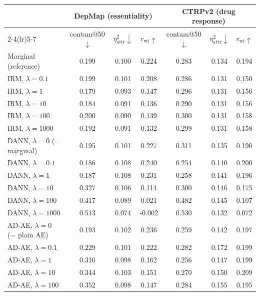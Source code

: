 \begin{table}[t]
  \centering
  \footnotesize
  \begin{tabular}{l ccc ccc}
    \toprule
    & \multicolumn{3}{c}{DepMap (essentiality)} & \multicolumn{3}{c}{CTRPv2 (drug response)} \\
    \cmidrule(lr){2-4}\cmidrule(lr){5-7}
    & contam@50$\downarrow$ & $\eta^2_{\mathrm{attr}}\downarrow$ & $r_{\mathrm{wt}}\uparrow$ & contam@50$\downarrow$ & $\eta^2_{\mathrm{attr}}\downarrow$ & $r_{\mathrm{wt}}\uparrow$ \\
    \midrule
    Marginal (reference) & 0.199 & 0.100 & 0.224 & 0.283 & 0.134 & 0.194 \\
    \midrule
    \quad IRM, $\lambda=0.1$ & 0.199 & 0.101 & 0.208 & 0.286 & 0.131 & 0.150 \\
    \quad IRM, $\lambda=1$ & 0.179 & 0.093 & 0.147 & 0.296 & 0.131 & 0.156 \\
    \quad IRM, $\lambda=10$ & 0.184 & 0.091 & 0.136 & 0.290 & 0.131 & 0.156 \\
    \quad IRM, $\lambda=100$ & 0.200 & 0.090 & 0.139 & 0.300 & 0.131 & 0.158 \\
    \quad IRM, $\lambda=1000$ & 0.192 & 0.091 & 0.132 & 0.299 & 0.131 & 0.158 \\
    \addlinespace
    \quad DANN, $\lambda=0$ (= marginal) & 0.195 & 0.101 & 0.227 & 0.311 & 0.135 & 0.190 \\
    \quad DANN, $\lambda=0.1$ & 0.186 & 0.108 & 0.240 & 0.254 & 0.140 & 0.200 \\
    \quad DANN, $\lambda=1$ & 0.187 & 0.108 & 0.231 & 0.258 & 0.141 & 0.196 \\
    \quad DANN, $\lambda=10$ & 0.327 & 0.106 & 0.114 & 0.300 & 0.146 & 0.175 \\
    \quad DANN, $\lambda=100$ & 0.417 & 0.089 & 0.021 & 0.482 & 0.145 & 0.107 \\
    \quad DANN, $\lambda=1000$ & 0.513 & 0.074 & -0.002 & 0.530 & 0.132 & 0.072 \\
    \addlinespace
    \quad AD-AE, $\lambda=0$ (= plain AE) & 0.193 & 0.102 & 0.236 & 0.259 & 0.142 & 0.197 \\
    \quad AD-AE, $\lambda=0.1$ & 0.229 & 0.101 & 0.222 & 0.282 & 0.172 & 0.199 \\
    \quad AD-AE, $\lambda=1$ & 0.316 & 0.098 & 0.162 & 0.256 & 0.147 & 0.199 \\
    \quad AD-AE, $\lambda=10$ & 0.344 & 0.103 & 0.151 & 0.270 & 0.150 & 0.209 \\
    \quad AD-AE, $\lambda=100$ & 0.352 & 0.098 & 0.147 & 0.284 & 0.155 & 0.195 \\

\end{tabular}
\end{table}
